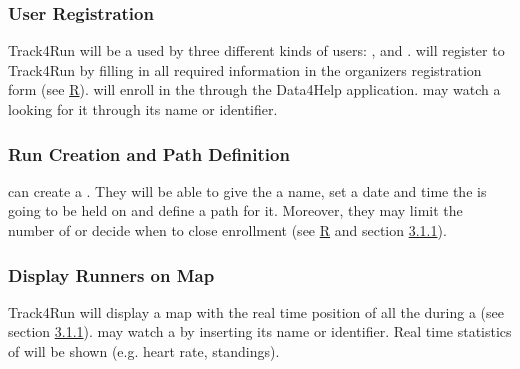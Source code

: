 \documentclass[../../rasd.tex]{subfiles}
\begin{document}
		\subsubsection{User Registration}
		Track4Run will be a  used by three different kinds of users: ,  and .  will register to Track4Run by filling in all required information in the organizers registration form (see \hyperref[sect:3.2.5]{R}).  will enroll in the  through the Data4Help application.  may watch a  looking for it through its name or identifier.
		
		\subsubsection{Run Creation and Path Definition}
		 can create a . They will be able to give the  a name, set a date and time the  is going to be held on and define a path for it. Moreover, they may limit the number of  or decide when to close enrollment (see \hyperref[sect:3.2.5]{R} and section \hyperref[sect:3.1.1]{3.1.1}).
		
		\subsubsection{Display Runners on Map}
		Track4Run will display a map with the real time position of all the  during a  (see section \hyperref[sect:3.1.1]{3.1.1}).  may watch a  by inserting its name or identifier. Real time statistics of  will be shown (e.g. heart rate, standings). 
\end{document}
